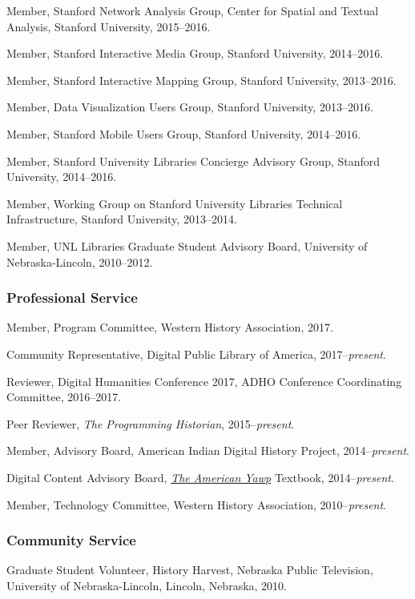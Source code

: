 Member, Stanford Network Analysis Group, Center for Spatial and Textual
Analysis, Stanford University, 2015--2016.

Member, Stanford Interactive Media Group, Stanford University,
2014--2016.

Member, Stanford Interactive Mapping Group, Stanford University,
2013--2016.

Member, Data Visualization Users Group, Stanford University, 2013--2016.

Member, Stanford Mobile Users Group, Stanford University, 2014--2016.

Member, Stanford University Libraries Concierge Advisory Group, Stanford
University, 2014--2016.

Member, Working Group on Stanford University Libraries Technical
Infrastructure, Stanford University, 2013--2014.

Member, UNL Libraries Graduate Student Advisory Board, University of
Nebraska-Lincoln, 2010--2012.

\subsubsection{Professional Service}\label{professional-service}

Member, Program Committee, Western History Association, 2017.

Community Representative, Digital Public Library of America,
2017--\emph{present}.

Reviewer, Digital Humanities Conference 2017, ADHO Conference
Coordinating Committee, 2016--2017.

Peer Reviewer, \emph{The Programming Historian}, 2015--\emph{present}.

Member, Advisory Board, American Indian Digital History Project,
2014--\emph{present}.

Digital Content Advisory Board, \emph{\href{http://americanyawp.com}{The
American Yawp}} Textbook, 2014--\emph{present}.

Member, Technology Committee, Western History Association,
2010--\emph{present}.

\subsubsection{Community Service}\label{community-service}

Graduate Student Volunteer, History Harvest, Nebraska Public Television,
University of Nebraska-Lincoln, Lincoln, Nebraska, 2010.

